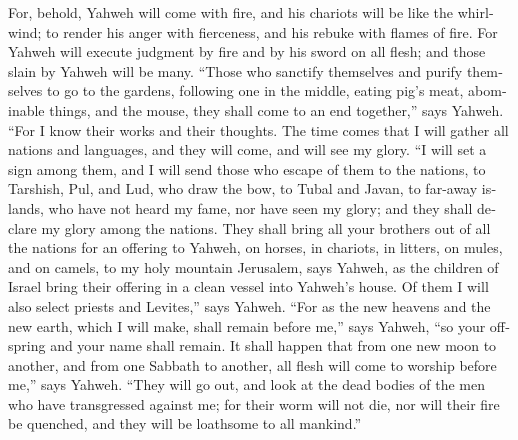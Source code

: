 \begin{paracol}{2}
\begin{otherlanguage}{english}
 For, behold, Yahweh will come with fire, and his
chariots will be like the whirlwind; to render his anger with
fierceness, and his rebuke with flames of fire.  For
Yahweh will execute judgment by fire and by his sword on all flesh; and
those slain by Yahweh will be many.  ``Those who sanctify
themselves and purify themselves to go to the gardens, following one in
the middle, eating pig's meat, abominable things, and the mouse, they
shall come to an end together,'' says Yahweh.  ``For I
know their works and their thoughts. The time comes that I will gather
all nations and languages, and they will come, and will see my glory.
 ``I will set a sign among them, and I will send those
who escape of them to the nations, to Tarshish, Pul, and Lud, who draw
the bow, to Tubal and Javan, to far-away islands, who have not heard my
fame, nor have seen my glory; and they shall declare my glory among the
nations.  They shall bring all your brothers out of all
the nations for an offering to Yahweh, on horses, in chariots, in
litters, on mules, and on camels, to my holy mountain Jerusalem, says
Yahweh, as the children of Israel bring their offering in a clean vessel
into Yahweh's house.  Of them I will also select priests
and Levites,'' says Yahweh.  ``For as the new heavens and
the new earth, which I will make, shall remain before me,'' says Yahweh,
``so your offspring and your name shall remain.  It shall
happen that from one new moon to another, and from one Sabbath to
another, all flesh will come to worship before me,'' says Yahweh.
 ``They will go out, and look at the dead bodies of the
men who have transgressed against me; for their worm will not die, nor
will their fire be quenched, and they will be loathsome to all
mankind.'' \end{otherlanguage} \end{paracol}
